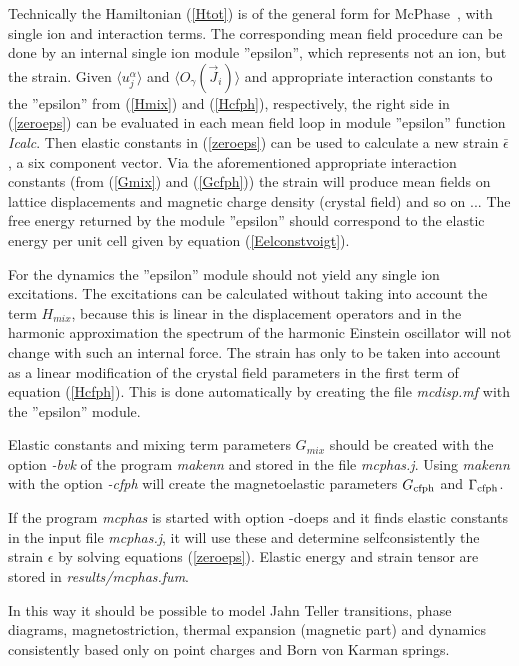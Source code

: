 Technically the Hamiltonian (\ref{Htot}) is of the general form for 
McPhase~\cite{rotter12-213201}, with single
ion and interaction terms. The corresponding  mean field procedure can be done by an internal single ion module 
''epsilon'', which represents not an ion, but the
strain. Given $\langle u_{j}^{\alpha} \rangle$ and $\langle O_{\gamma}(\vec J_i) \rangle$ and
appropriate interaction constants to the ''epsilon'' from (\ref{Hmix}) and (\ref{Hcfph}), respectively,
the right side in (\ref{zeroeps}) can be evaluated in each mean field loop 
in module ''epsilon'' function {\em Icalc}. Then elastic constants in (\ref{zeroeps}) can be used to calculate
a new strain $\bar \epsilon$, a six component vector. Via the aforementioned appropriate
interaction constants (from (\ref{Gmix}) and (\ref{Gcfph})) the strain will produce mean
fields on lattice displacements and magnetic charge density (crystal field) and so on ...
The free energy returned by the module ''epsilon'' should correspond to the elastic energy
per unit cell given by equation (\ref{Eelconstvoigt}). 

For the dynamics the ''epsilon'' module should not
yield any single ion excitations. The excitations can be calculated without taking into account the
term $H_{mix}$, because this is linear in the displacement operators and in the harmonic
approximation the spectrum of the harmonic Einstein oscillator will not change with such an
internal force. The strain has only to be taken into account as a linear modification of the crystal field
parameters in the first term of equation (\ref{Hcfph}). This is done automatically by creating the
file {\em mcdisp.mf} with the ''epsilon'' module.

Elastic constants and mixing term parameters $G_{mix}$ should be created with the
option {\em -bvk} of the program {\em makenn} and stored in the 
file {\em mcphas.j}. Using {\em makenn} with the option {\em -cfph} will create
the magnetoelastic parameters $G_{\rm cfph}$ and $\Gamma_{\rm cfph}$.

If the program {\em mcphas} is started with option {\prg -doeps}
and it finds elastic constants in the input file {\em mcphas.j}, it
 will use these and determine selfconsistently the strain $\epsilon$ by solving equations
(\ref{zeroeps}). Elastic energy and strain tensor are stored in {\em results/mcphas.fum}.

 In this way it should be possible to model Jahn Teller transitions,
phase diagrams, magnetostriction, thermal expansion (magnetic part) and dynamics consistently based
only on point charges and Born von Karman springs. 

